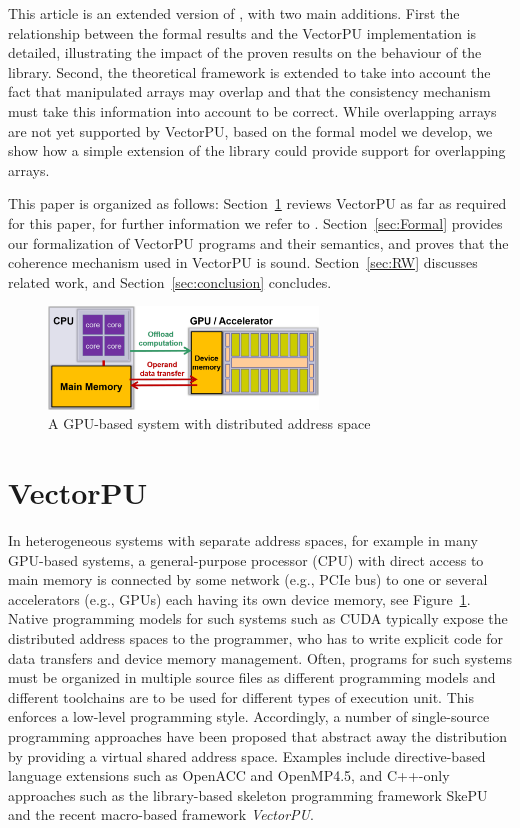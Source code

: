 This article is an extended version of \cite{HKL-4PAD2018}, with two main additions. First the relationship between the formal results and the VectorPU implementation is  detailed, illustrating the impact of the proven results on the behaviour of the library. Second, the theoretical framework is extended to take into account the fact that manipulated arrays may overlap and that the consistency mechanism must take this information into account to be correct. While overlapping arrays are not yet supported by VectorPU, based on the formal model we develop, we show how a simple extension of the library could provide support for overlapping arrays.

This paper is organized as follows:
Section~\ref{VectorPU} reviews VectorPU as far as required for  this paper, for further information we refer to \cite{VectorPU-2017}.
Section~\ref{sec:Formal} provides our formalization of VectorPU programs and
their semantics, and proves that the coherence mechanism used in
VectorPU is sound. Section~\ref{sec:RW} discusses related work, and 
Section~\ref{sec:conclusion} concludes.

\begin{figure}
\begin{center}
\includegraphics[width=0.64\textwidth]{img/CPU-GPU.png}
\caption{\label{fig:CPU-GPU}A GPU-based system with distributed address space}
\end{center}
\end{figure}

\section{VectorPU}\label{VectorPU}

In heterogeneous systems with separate address spaces, for example in 
many GPU-based systems, a general-purpose processor
(CPU) with direct access to main memory is connected by some network
(e.g., PCIe bus) to one or several accelerators
(e.g., GPUs) each having its own device memory,
see Figure~\ref{fig:CPU-GPU}. Native programming models
for such systems such as CUDA typically expose the distributed address spaces to the programmer, who has to write explicit 
code for data transfers and device memory management.
Often, programs for such systems  must be organized in multiple source files
as different programming models and different toolchains
are to be used for different types of execution unit.
This enforces a low-level programming style. 
Accordingly, a number of single-source 
programming approaches have been proposed that abstract away the distribution 
by providing a virtual shared address space. Examples include directive-based
language extensions such as OpenACC and OpenMP4.5, and C++-only approaches 
such as the library-based skeleton programming framework SkePU \cite{Dastgeer-IJPP15}
and the recent macro-based framework \textit{VectorPU}.

